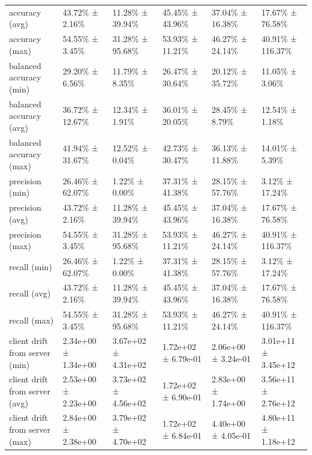 \begin{tabular}{llllll}
 accuracy (avg)                     & 43.72\% ± 2.16\%      & 11.28\% ± 39.94\%     & 45.45\% ± 43.96\%     & 37.04\% ± 16.38\%     & 17.67\% ± 76.58\%     \\
 accuracy (max)                     & 54.55\% ± 3.45\%      & 31.28\% ± 95.68\%     & 53.93\% ± 11.21\%     & 46.27\% ± 24.14\%     & 40.91\% ± 116.37\%    \\
 balanced accuracy (min)            & 29.20\% ± 6.56\%      & 11.79\% ± 8.35\%      & 26.47\% ± 30.64\%     & 20.12\% ± 35.72\%     & 11.05\% ± 3.06\%      \\
 balanced accuracy (avg)            & 36.72\% ± 12.67\%     & 12.34\% ± 1.91\%      & 36.01\% ± 20.05\%     & 28.45\% ± 8.79\%      & 12.54\% ± 1.18\%      \\
 balanced accuracy (max)            & 41.94\% ± 31.67\%     & 12.52\% ± 0.04\%      & 42.73\% ± 30.47\%     & 36.13\% ± 11.88\%     & 14.01\% ± 5.39\%      \\
 precision (min)                    & 26.46\% ± 62.07\%     & 1.22\% ± 0.00\%       & 37.31\% ± 41.38\%     & 28.15\% ± 57.76\%     & 3.12\% ± 17.24\%      \\
 precision (avg)                    & 43.72\% ± 2.16\%      & 11.28\% ± 39.94\%     & 45.45\% ± 43.96\%     & 37.04\% ± 16.38\%     & 17.67\% ± 76.58\%     \\
 precision (max)                    & 54.55\% ± 3.45\%      & 31.28\% ± 95.68\%     & 53.93\% ± 11.21\%     & 46.27\% ± 24.14\%     & 40.91\% ± 116.37\%    \\
 recall (min)                       & 26.46\% ± 62.07\%     & 1.22\% ± 0.00\%       & 37.31\% ± 41.38\%     & 28.15\% ± 57.76\%     & 3.12\% ± 17.24\%      \\
 recall (avg)                       & 43.72\% ± 2.16\%      & 11.28\% ± 39.94\%     & 45.45\% ± 43.96\%     & 37.04\% ± 16.38\%     & 17.67\% ± 76.58\%     \\
 recall (max)                       & 54.55\% ± 3.45\%      & 31.28\% ± 95.68\%     & 53.93\% ± 11.21\%     & 46.27\% ± 24.14\%     & 40.91\% ± 116.37\%    \\
 client drift from server (min)     & 2.34e+00 ± 1.34e+00 & 3.67e+02 ± 4.31e+02 & 1.72e+02 ± 6.79e-01 & 2.06e+00 ± 3.24e-01 & 3.01e+11 ± 3.45e+12 \\
 client drift from server (avg)     & 2.53e+00 ± 2.23e+00 & 3.73e+02 ± 4.56e+02 & 1.72e+02 ± 6.90e-01 & 2.83e+00 ± 1.74e+00 & 3.56e+11 ± 2.76e+12 \\
 client drift from server (max)     & 2.84e+00 ± 2.38e+00 & 3.79e+02 ± 4.70e+02 & 1.72e+02 ± 6.84e-01 & 4.40e+00 ± 4.05e-01 & 4.80e+11 ± 1.18e+12 \\

\end{tabular}
